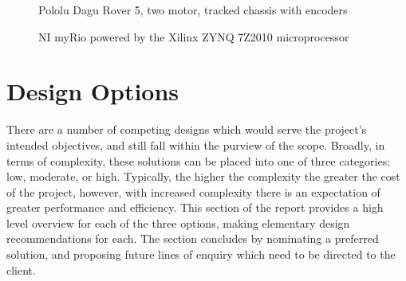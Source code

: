 \documentclass[a4paper]{article}
\begin{document}
\begin{figure}[h]
\centering
\begin{minipage}{0.45\textwidth}
\centering
{}
\caption{Pololu Dagu Rover 5, two motor, tracked chassis with encoders}
\end{minipage}
\hspace{1cm}
\begin{minipage}{0.45\textwidth}
\centering
{}
\caption{NI myRio powered by the Xilinx ZYNQ 7Z2010 microprocessor}
\end{minipage}
\end{figure}

\section{Design Options}
There are a number of competing designs which would serve the project's intended objectives, and still fall within the purview of the scope. Broadly, in terms of complexity, these solutions can be placed into one of three categories: low, moderate, or high. Typically, the higher the complexity the greater the cost of the project, however, with increased complexity there is an expectation of greater performance and efficiency. This section of the report provides a high level overview for each of the three options, making elementary design recommendations for each. The section concludes by nominating a preferred solution, and proposing future lines of enquiry which need to be directed to the client.
\end{document}
